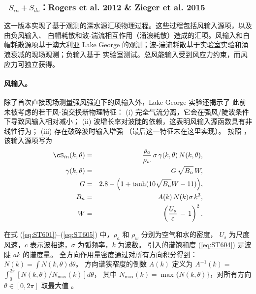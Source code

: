 \vsssub
\subsubsection{~$S_{in} + S_{ds}$：Rogers et al. 2012 \& Zieger et al. 2015} \label{sec:ST6}
\vsssub


\noindent
这一版本实现了基于观测的深水源汇项物理过程。这些过程包括风输入源项，以及由负风输入、
白帽耗散和波-湍流相互作用（涌浪耗散）造成的汇项。风输入和白帽耗散源项基于澳大利亚
Lake George 的观测；波-湍流耗散基于实验室实验和涌浪衰减的现场观测；负输入基于
实验室测试。总风能输入受到风应力约束，而风应力可独立获得。

\paragraph{风输入。} 除了首次直接现场测量强风强迫下的风输入外，Lake George 实验还揭示了
此前未被考虑的若干风-浪交换新物理特征：
(i) 完全气流分离，它会在强风/陡波条件下导致风输入相对减小；
(ii) 波增长率对波陡的依赖，这表明风输入源函数具有非线性行为；
(iii) 存在破碎波时输入增强
\citep{art:Dea06,art:Bea07}（最后这一特征未在这里实现）。
按照 \citet{art:RBW12}，该输入源项写为
\begin{eqnarray}
\cS_{in}(k,\theta) & = & \frac{\rho_a}{\rho_w}\, \sigma\,\gamma(k,\theta)\,N(k,\theta)  ,
\label{eq:ST601} \\ \gamma(k,\theta) &=& G\,\sqrt{B_n}\,W  ,
\label{eq:ST602} \\
G                &=& 2.8-\Bigl (1+\tanh (10\sqrt{B_n}W-11) \Bigr)  ,
\label{eq:ST603} \\
B_n              &=& A(k)\,N(k)\sigma\,k^3  ,
\label{eq:ST604} \\
W                &=& \left (\frac{U_s}{c}\,-\,1 \right )^2  .
\label{eq:ST605}
\end{eqnarray}

\noindent
在式 (\ref{eq:ST601})--(\ref{eq:ST605}) 中，$\rho_a$ 和 $\rho_w$ 分别为空气和水的密度，
$U_s$ 为尺度风速，$c$ 表示波相速，$\sigma$ 为弧频率，$k$ 为波数。
\citet{art:Phi84} 引入的谱饱和度 (\ref{eq:ST604}) 是波陡 $ak$ 的谱度量。
全方向作用量密度通过对所有方向积分得到：
$N(k)=\int N(k,\theta)d\theta$。\linebreak
方向谱狭窄度的倒数 $A(k)$ 定义为\linebreak
$A^{-1}(k) =$ $\int_{0}^{2\pi} [{N(k,\theta)}/{N_{\max}(k)}] d\theta$，
其中 $N_{\max}(k)=\max\bigl \{N(k,\theta)\bigr \}$，对所有方向
$\theta\in[0,2\pi]$ 取最大值 \citep{art:BS87}。

